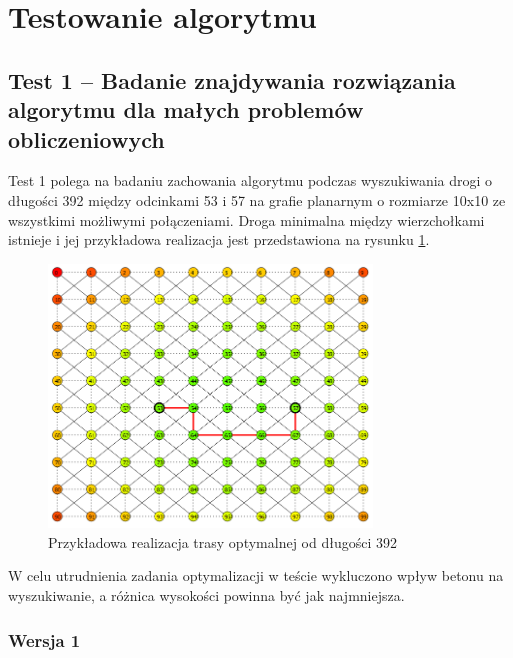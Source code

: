 \documentclass[12pt,a4paper]{article}
\begin{document}
\section{Testowanie algorytmu}
\subsection{Test 1 -- Badanie znajdywania rozwiązania algorytmu dla małych problemów obliczeniowych}
Test 1 polega na badaniu zachowania algorytmu podczas wyszukiwania drogi o długości 392 między odcinkami 53 i 57 na grafie planarnym o rozmiarze 10x10 ze wszystkimi możliwymi połączeniami. Droga minimalna między wierzchołkami istnieje i jej przykładowa realizacja jest przedstawiona na rysunku \ref{test1_0}.
\begin{figure}[!h]
	\centering
	\includegraphics[height=70mm]{./ilustracje/test10.png}
	\caption{Przykładowa realizacja trasy optymalnej od długości 392 }
	\label{test1_0}
\end{figure}
W celu utrudnienia zadania optymalizacji w teście wykluczono wpływ betonu na wyszukiwanie, a różnica wysokości powinna być jak najmniejsza.
\subsubsection{Wersja 1}
\end{document}

